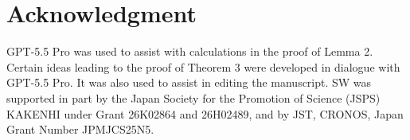 \documentclass[journal,draftcls, onecolumn]{IEEEtran}
\begin{document}
\section*{Acknowledgment}

GPT-5.5 Pro was used to assist with calculations in the proof of Lemma 2. Certain ideas leading to the proof of 
Theorem 3 were developed in dialogue with GPT-5.5 Pro. It was also used to assist in editing the manuscript.
SW was supported in part by the Japan Society for the Promotion of Science (JSPS) KAKENHI under Grant
26K02864 and 26H02489, and by JST, CRONOS, Japan Grant
Number JPMJCS25N5.




\end{document}
